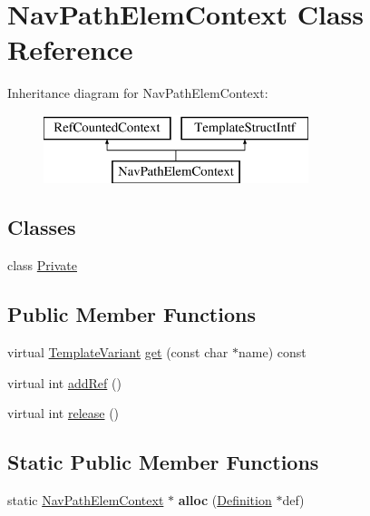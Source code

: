 \hypertarget{class_nav_path_elem_context}{}\section{Nav\+Path\+Elem\+Context Class Reference}
\label{class_nav_path_elem_context}
Inheritance diagram for Nav\+Path\+Elem\+Context\+:\begin{figure}[H]
\begin{center}
\leavevmode
\includegraphics[height=2.000000cm]{class_nav_path_elem_context}
\end{center}
\end{figure}
\subsection*{Classes}
\begin{DoxyCompactItemize}
\item 
class \mbox{\hyperlink{class_nav_path_elem_context_1_1_private}{Private}}
\end{DoxyCompactItemize}
\subsection*{Public Member Functions}
\begin{DoxyCompactItemize}
\item 
virtual \mbox{\hyperlink{class_template_variant}{Template\+Variant}} \mbox{\hyperlink{class_nav_path_elem_context_a3f3e6b9d82f65a3ba6c5ac92fe315f2a}{get}} (const char $\ast$name) const
\item 
virtual int \mbox{\hyperlink{class_nav_path_elem_context_acb59dcbc239ee16b89c24a85ef2c5bce}{add\+Ref}} ()
\item 
virtual int \mbox{\hyperlink{class_nav_path_elem_context_af1e44c0b19b04c0b3ed51f955005a97e}{release}} ()
\end{DoxyCompactItemize}
\subsection*{Static Public Member Functions}
\begin{DoxyCompactItemize}
\item 
\mbox{\label{class_nav_path_elem_context_aa0132826a523f5e429474c084f2d6cbc}} 
static \mbox{\hyperlink{class_nav_path_elem_context}{Nav\+Path\+Elem\+Context}} $\ast$ {\bfseries alloc} (\mbox{\hyperlink{class_definition}{Definition}} $\ast$def)
\end{DoxyCompactItemize}


